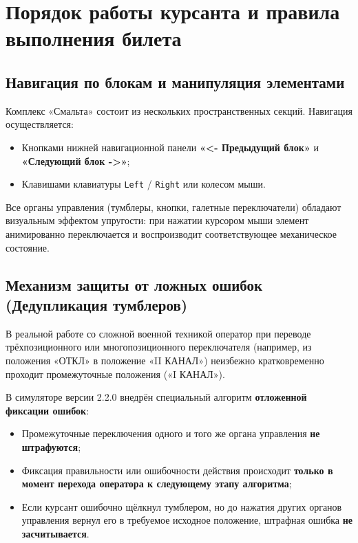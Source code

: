 \documentclass[12pt,a4paper]{report}
\begin{document}
\chapter{Порядок работы курсанта и правила выполнения билета}

\section{Навигация по блокам и манипуляция элементами}
Комплекс «Смальта» состоит из нескольких пространственных секций. Навигация осуществляется:
\begin{itemize}
    \item Кнопками нижней навигационной панели \textbf{«<- Предыдущий блок»} и \textbf{«Следующий блок ->»};
    \item Клавишами клавиатуры \texttt{Left} / \texttt{Right} или колесом мыши.
\end{itemize}

Все органы управления (тумблеры, кнопки, галетные переключатели) обладают визуальным эффектом упругости: при нажатии курсором мыши элемент анимированно переключается и воспроизводит соответствующее механическое состояние.

\section{Механизм защиты от ложных ошибок (Дедупликация тумблеров)}
\begin{infoNote}
    В реальной работе со сложной военной техникой оператор при переводе трёхпозиционного или многопозиционного переключателя (например, из положения «ОТКЛ» в положение «II КАНАЛ») неизбежно кратковременно проходит промежуточные положения («I КАНАЛ»).
\end{infoNote}

В симуляторе версии 2.2.0 внедрён специальный алгоритм \textbf{отложенной фиксации ошибок}:
\begin{itemize}
    \item Промежуточные переключения одного и того же органа управления \textbf{не штрафуются};
    \item Фиксация правильности или ошибочности действия происходит \textbf{только в момент перехода оператора к следующему этапу алгоритма};
    \item Если курсант ошибочно щёлкнул тумблером, но до нажатия других органов управления вернул его в требуемое исходное положение, штрафная ошибка \textbf{не засчитывается}.
\end{itemize}
\end{document}
